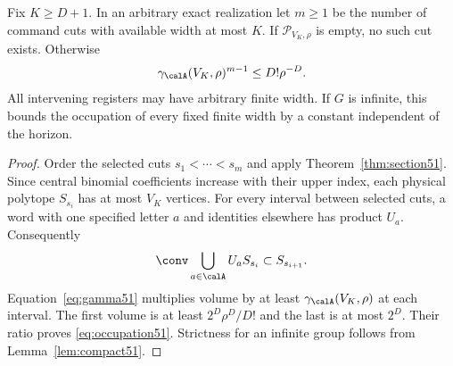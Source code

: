 \begin{theorem}\label{thm:occupation51}
Fix $K\ge D+1$. In an arbitrary exact realization let $m\ge1$ be
the number of command cuts with available width at most $K$.
If $\mathscr P_{V_K,\rho}$ is empty, no such cut exists. Otherwise
\begin{equation}\label{eq:occupation51}
 \gamma_{\calA}(V_K,\rho)^{m-1}\le D!\rho^{-D}.
\end{equation}
All intervening registers may have arbitrary finite width. If $G$ is
infinite, this bounds the occupation of every fixed finite width by a
constant independent of the horizon.
\end{theorem}
\begin{proof}
Order the selected cuts $s_1<\cdots<s_m$ and apply
Theorem~\ref{thm:section51}. Since central binomial coefficients
increase with their upper index, each physical polytope $S_{s_i}$
has at most $V_K$ vertices. For every interval between selected cuts,
a word with one specified letter $a$ and identities elsewhere has
product $U_a$. Consequently
\[
 \conv\bigcup_{a\in\calA}U_aS_{s_i}\subset S_{s_{i+1}}.
\]
Equation~\eqref{eq:gamma51} multiplies volume by at least
$\gamma_{\calA}(V_K,\rho)$ at each interval. The first volume is at
least $2^D\rho^D/D!$ and the last is at most $2^D$.
Their ratio proves \eqref{eq:occupation51}. Strictness for an infinite
group follows from Lemma~\ref{lem:compact51}.
\end{proof}

